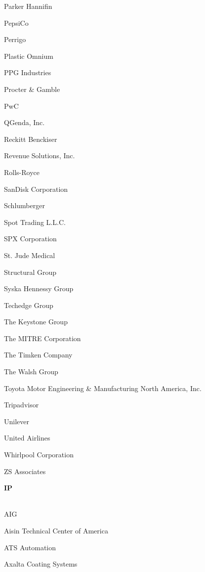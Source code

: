 \documentclass[twoside]{article}
\begin{document}
\begin{center}
\begin{multicols}{5}
\begin{FlushLeft}
\begin{compactitem}
\item Parker Hannifin
\item PepsiCo
\item Perrigo
\item Plastic Omnium
\item PPG Industries
\item Procter \& Gamble
\item PwC
\item QGenda, Inc.
\item Reckitt Benckiser
\item Revenue Solutions, Inc.
\item Rolls-Royce
\item SanDisk Corporation
\item Schlumberger
\item Spot Trading L.L.C.
\item SPX Corporation
\item St. Jude Medical
\item Structural Group
\item Syska Hennessy Group
\item Techedge Group
\item The Keystone Group
\item The MITRE Corporation
\item The Timken Company
\item The Walsh Group
\item Toyota Motor Engineering \& Manufacturing North America, Inc.
\item Tripadvisor
\item Unilever
\item United Airlines
\item Whirlpool Corporation
\item ZS Associates
\end{compactitem}
        \end{FlushLeft}
        \vspace{1em}
        {\fontsize{14}{16}\selectfont \bf IP}\\
        \vspace{-1em}
        ~\hrulefill~
        \vspace{-.9em}
        \begin{FlushLeft}
        \begin{compactitem}
        \item AIG
\item Aisin Technical Center of America
\item ATS Automation
\item Axalta Coating Systems

\end{compactitem}
\end{FlushLeft}
\end{multicols}
\end{center}
\end{document}
